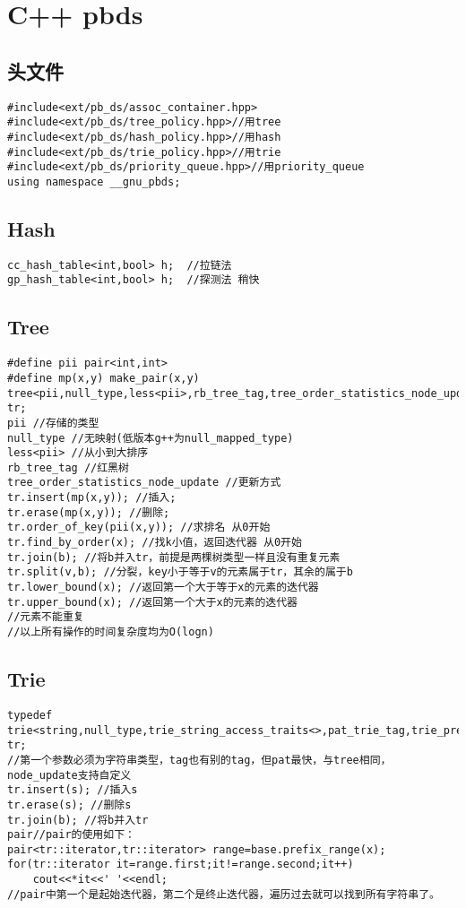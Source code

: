 \documentclass[twocolumn,a4]{article}
\begin{document}
\section{C++ pbds}
\subsection{头文件}
\begin{lstlisting}
#include<ext/pb_ds/assoc_container.hpp>
#include<ext/pb_ds/tree_policy.hpp>//用tree
#include<ext/pb_ds/hash_policy.hpp>//用hash
#include<ext/pb_ds/trie_policy.hpp>//用trie
#include<ext/pb_ds/priority_queue.hpp>//用priority_queue
using namespace __gnu_pbds;
\end{lstlisting}
\subsection{Hash}
\begin{lstlisting}
cc_hash_table<int,bool> h;  //拉链法
gp_hash_table<int,bool> h;  //探测法 稍快
\end{lstlisting}
\subsection{Tree}
\begin{lstlisting}
#define pii pair<int,int>
#define mp(x,y) make_pair(x,y)
tree<pii,null_type,less<pii>,rb_tree_tag,tree_order_statistics_node_update> tr;
pii //存储的类型
null_type //无映射(低版本g++为null_mapped_type)
less<pii> //从小到大排序
rb_tree_tag //红黑树
tree_order_statistics_node_update //更新方式
tr.insert(mp(x,y)); //插入;
tr.erase(mp(x,y)); //删除;
tr.order_of_key(pii(x,y)); //求排名 从0开始
tr.find_by_order(x); //找k小值，返回迭代器 从0开始
tr.join(b); //将b并入tr，前提是两棵树类型一样且没有重复元素
tr.split(v,b); //分裂，key小于等于v的元素属于tr，其余的属于b
tr.lower_bound(x); //返回第一个大于等于x的元素的迭代器
tr.upper_bound(x); //返回第一个大于x的元素的迭代器
//元素不能重复
//以上所有操作的时间复杂度均为O(logn)
\end{lstlisting}
\subsection{Trie}
\begin{lstlisting}
typedef trie<string,null_type,trie_string_access_traits<>,pat_trie_tag,trie_prefix_search_node_update> tr;
//第一个参数必须为字符串类型，tag也有别的tag，但pat最快，与tree相同，node_update支持自定义
tr.insert(s); //插入s
tr.erase(s); //删除s
tr.join(b); //将b并入tr
pair//pair的使用如下：
pair<tr::iterator,tr::iterator> range=base.prefix_range(x);
for(tr::iterator it=range.first;it!=range.second;it++)
    cout<<*it<<' '<<endl;
//pair中第一个是起始迭代器，第二个是终止迭代器，遍历过去就可以找到所有字符串了。
\end{lstlisting}
\end{document}
